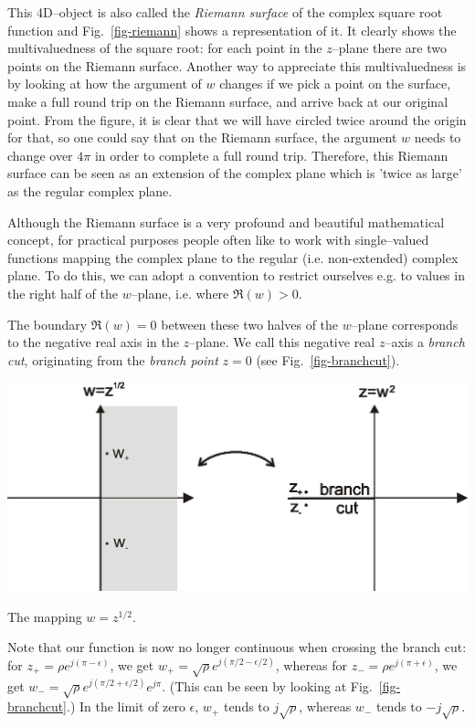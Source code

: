 This 4D--object is also called the \emph{Riemann surface} of the complex square
root function and Fig.~\ref{fig-riemann} shows a representation of it. It clearly shows the multivaluedness of the square root: for each
point in the $z$--plane there are two points on the Riemann surface. Another way
to appreciate this multivaluedness is by looking at how the argument of $w$
changes if we pick a point on the surface, make a full round trip on the Riemann
surface, and arrive back at our original point. From the figure, it is clear
that we will have circled twice around the origin for that, so one could say
that on the Riemann surface, the argument $w$ needs to change over $4 \pi$ in
order to complete a full round trip. Therefore, this Riemann surface can be seen
as an extension of the complex plane which is 'twice as large' as the regular
complex plane.

Although the Riemann surface is a very profound and beautiful mathematical
concept, for practical purposes people often like to work with single--valued
functions mapping the complex plane to the regular (i.e. non-extended) complex
plane. To do this, we can adopt a convention to restrict ourselves e.g. to
values in the right half of the $w$--plane, i.e. where $\Re(w)>0$.

The boundary $\Re(w)=0$ between these two halves of the $w$--plane corresponds
to the negative real axis in the $z$--plane. We call this negative real
$z$--axis a \emph{branch cut}, originating from the \emph{branch point} $z=0$
(see Fig.~\ref{fig-branchcut}).

\begin{marginfigure}
\centering
\includegraphics{complex/figures/branchcut}
\caption{The mapping $w=z^{1/2}$.}
\label{fig-branchcut}
\end{marginfigure}

Note that our function is now no longer continuous when crossing the branch cut:
for $z_+ = \rho e^{j (\pi - \epsilon)}$, we get $w_+ = \sqrt{\rho} e^{j (\pi/2 -
\epsilon/2)}$, whereas for $z_- = \rho e^{j (\pi + \epsilon)}$, we get $w_- =
\sqrt{\rho} e^{j (\pi/2 + \epsilon/2)} e^{j \pi}$. (This can be seen by looking
at Fig.~\ref{fig-branchcut}.) In the limit of zero $\epsilon$, $w_+$ tends to
$j\sqrt{\rho}$, whereas $w_-$ tends to $-j\sqrt{\rho}$.


